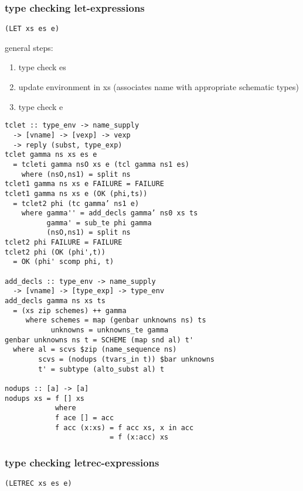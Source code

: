 \documentclass[8pt]{extarticle}
\begin{document}
\begin{multicols*}{2}
\subsubsection{type checking let-expressions}

\verb|(LET xs es e)|

general steps:
\begin{enumerate}
\item type check es
\item update environment in xs (associates name with appropriate schematic types)
\item type check e
\end{enumerate}

\begin{verbatim}
tclet :: type_env -> name_supply
  -> [vname] -> [vexp] -> vexp
  -> reply (subst, type_exp)
tclet gamma ns xs es e
  = tcleti gamma nsO xs e (tcl gamma ns1 es)
    where (nsO,ns1) = split ns
tclet1 gamma ns xs e FAILURE = FAILURE
tclet1 gamma ns xs e (OK (phi,ts))
  = tclet2 phi (tc gamma’ ns1 e)
    where gamma'' = add_decls gamma’ ns0 xs ts
          gamma' = sub_te phi gamma
          (nsO,ns1) = split ns
tclet2 phi FAILURE = FAILURE
tclet2 phi (OK (phi',t))
  = OK (phi' scomp phi, t)

add_decls :: type_env -> name_supply
  -> [vname] -> [type_exp] -> type_env
add_decls gamma ns xs ts
  = (xs zip schemes) ++ gamma
     where schemes = map (genbar unknowns ns) ts
           unknowns = unknowns_te gamma
genbar unknowns ns t = SCHEME (map snd al) t'
  where al = scvs $zip (name_sequence ns)
        scvs = (nodups (tvars_in t)) $bar unknowns
        t' = subtype (alto_subst al) t

nodups :: [a] -> [a]
nodups xs = f [] xs
            where
            f ace [] = acc
            f acc (x:xs) = f acc xs, x in acc
                         = f (x:acc) xs
\end{verbatim}

\subsubsection{type checking letrec-expressions}

\verb|(LETREC xs es e)|


\end{multicols*}
\end{document}
